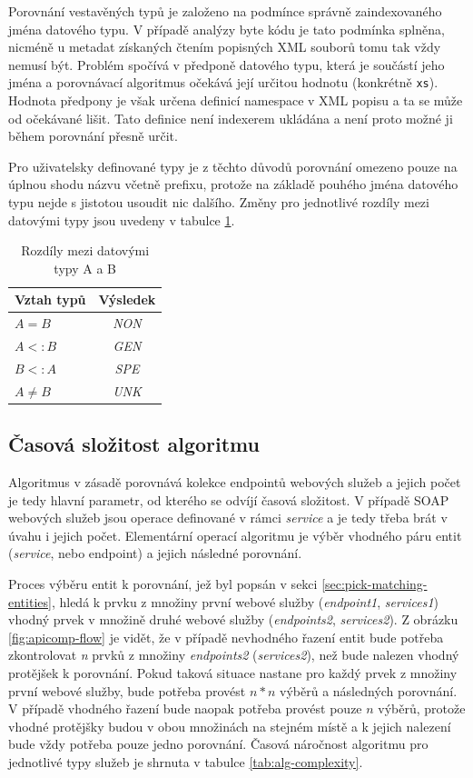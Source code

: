 \documentclass[czech,DP]{thesiskiv}
\begin{document}
Porovnání vestavěných typů je založeno na podmínce správně zaindexovaného jména datového typu. V případě analýzy byte kódu je tato podmínka splněna, nicméně u metadat získaných čtením popisných XML souborů tomu tak vždy nemusí být. Problém spočívá v  předponě datového typu, která je součástí jeho jména a porovnávací algoritmus očekává její určitou hodnotu (konkrétně \verb|xs|). Hodnota předpony je však určena definicí namespace v XML popisu a ta se může od očekávané lišit. Tato definice není indexerem ukládána a není proto možné ji během porovnání přesně určit.

Pro uživatelsky definované typy je z těchto důvodů porovnání omezeno pouze na úplnou shodu názvu včetně prefixu, protože na základě pouhého jména datového typu nejde s jistotou usoudit nic dalšího. Změny pro jednotlivé rozdíly mezi datovými typy jsou uvedeny v tabulce \ref{tab:type-cmp}.

\begin{table}[h]
	\centering
	\begin{tabular}{|l|c|}
		\hline
		Vztah typů & Výsledek \\
		\hline
		\hline
		$ A = B$ & \textit{NON} \\
		\hline
		$ A <: B$ & \textit{GEN} \\
		\hline
		$ B <: A$ & \textit{SPE} \\
		\hline
		$ A \neq B$ & \textit{UNK} \\
		\hline
	\end{tabular}
	\caption{Rozdíly mezi datovými typy A a B}
	\label{tab:type-cmp}
\end{table}


\subsection{Časová složitost algoritmu}

Algoritmus v zásadě porovnává kolekce endpointů webových služeb a jejich počet je tedy hlavní parametr, od kterého se odvíjí časová složitost. V případě SOAP webových služeb jsou operace definované v rámci \textit{service} a je tedy třeba brát v úvahu i jejich počet. Elementární operací algoritmu je výběr vhodného páru entit (\textit{service}, nebo endpoint) a jejich následné porovnání. 

Proces výběru entit k porovnání, jež byl popsán v sekci \ref{sec:pick-matching-entities}, hledá k prvku z množiny první webové služby (\textit{endpoint1}, \textit{services1}) vhodný prvek v množině druhé webové služby (\textit{endpoints2}, \textit{services2}). Z obrázku \ref{fig:apicomp-flow} je vidět, že v případě nevhodného řazení entit bude potřeba zkontrolovat \textit{n} prvků z množiny \textit{endpoints2} (\textit{services2}), než bude nalezen vhodný protějšek k porovnání. Pokud taková situace nastane pro každý prvek z množiny první webové služby, bude potřeba provést $n*n$ výběrů a následných porovnání. V případě vhodného řazení bude naopak potřeba provést pouze $n$ výběrů, protože vhodné protějšky budou v obou množinách na stejném místě a k jejich nalezení bude vždy potřeba pouze jedno porovnání. Časová náročnost algoritmu pro jednotlivé typy služeb je shrnuta v tabulce \ref{tab:alg-complexity}.
\end{document}
